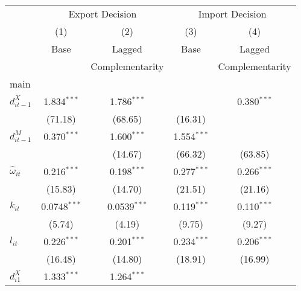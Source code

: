 \begin{center}
\begin{tabular}{l*{4}{c}}
\hline\hline&\multicolumn{2}{c}{Export
              Decision}&\multicolumn{2}{c}{Import Decision}\\
            &\multicolumn{1}{c}{(1)}&\multicolumn{1}{c}{(2)}&\multicolumn{1}{c}{(3)}&\multicolumn{1}{c}{(4)}\\
            &\multicolumn{1}{c}{Base}&\multicolumn{1}{c}{Lagged}&\multicolumn{1}{c}{Base}&\multicolumn{1}{c}{Lagged}\\
&\multicolumn{1}{c}{}&\multicolumn{1}{c}{Complementarity}&\multicolumn{1}{c}{}&\multicolumn{1}{c}{Complementarity}\\
\hline
main        &                     &                     &                     &                     \\
$d_{it-1}^{X}$      &       1.834$^{***}$&       1.786$^{***}$&                     &       0.380$^{***}$\\
                   &      (71.18)         &     (68.65)          &     (16.31)         &\\
[1em]                
$d_{it-1}^{M}$                            &       0.370$^{***}$&       1.600$^{***}$&       1.554$^{***}$\\
            &                             &     (14.67)         &     (66.32)         &     (63.85)         \\
[1em]                
$\hat{\omega}_{it}$ &       0.216$^{***}$&       0.198$^{***}$&       0.277$^{***}$&       0.266$^{***}$\\
                    &     (15.83)         &     (14.70)         &     (21.51)         &     (21.16)         \\
[1em]                
$k_{it}$            &      0.0748$^{***}$&      0.0539$^{***}$&       0.119$^{***}$&       0.110$^{***}$\\
            &              (5.74)         &      (4.19)         &      (9.75)         &      (9.27)         \\
[1em]                
$l_{it}$     &              0.226$^{***}$&       0.201$^{***}$&       0.234$^{***}$&       0.206$^{***}$\\
                    &     (16.48)         &     (14.80)         &     (18.91)         &     (16.99)         \\
[1em]                
$d_{i1}^{X}$          &      1.333$^{***}$&       1.264$^{***}$&                     &                     \\

\end{tabular}
\end{center}
